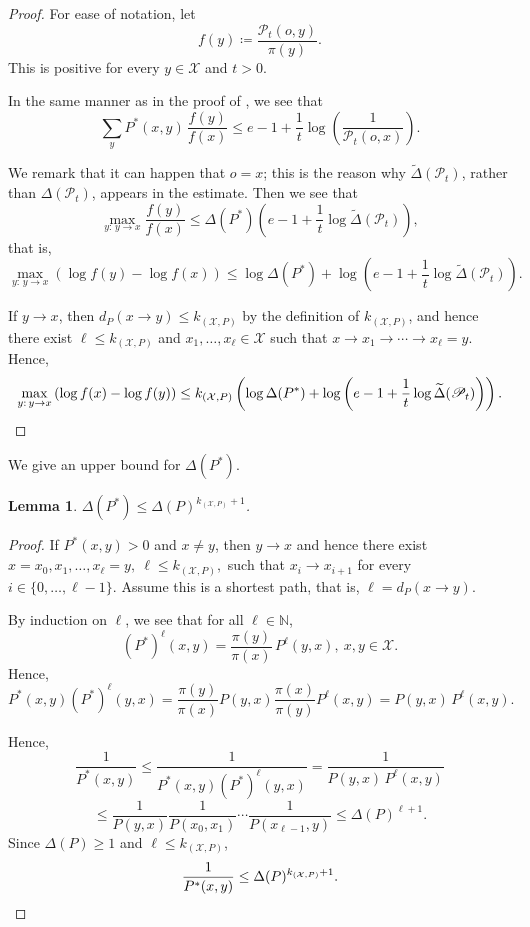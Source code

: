 \documentclass[a4paper, reqno, 11pt]{amsart}
\newtheorem{Lem}[Thm]{Lemma}
\theoremstyle{definition}
\begin{document}
\begin{proof} 
For ease of notation, let
\[ f(y) \coloneqq \frac{\mathscr{P}_{t} (o,y)}{\pi(y)}. \]
This is positive for every $y \in \mathcal{X}$ and $t > 0$. 


In the same manner as in the proof of \cite[Lemma 10]{Salez2024}, 
we see that 
\[ \sum_{y} P^*(x,y)\,\frac{f(y)}{f(x)} \le e-1+\frac{1}{t}\log\left(\frac{1}{\mathscr{P}_{t} (o,x)}\right). \]

We remark that it can happen that $o=x$; this is the reason why $\widetilde{\Delta}(\mathscr{P}_t)$, rather than $\Delta(\mathscr{P}_t)$, appears in the estimate.
Then we see that
\[ \max_{y:\,y\to x}\frac{f(y)}{f(x)} \le \Delta(P^*)\left(e-1+\frac{1}{t}\log \widetilde{\Delta}(\mathscr{P}_t)\right), \]
that is, 
\[ \max_{y:\,y\to x}\left(\log f(y)-\log f(x)\right) \le \log\Delta(P^*)+\log\left(e-1+\frac{1}{t}\log \widetilde{\Delta}(\mathscr{P}_t)\right).\]

If $y \to x$, then $d_P (x \to y) \le k_{(\mathcal{X}, P)}$ by the definition of $k_{(\mathcal{X}, P)}$,
and hence there exist $\ell \le k_{(\mathcal{X}, P)}$ and $x_1,\dots, x_\ell \in \mathcal{X}$
such that $x \to x_1\to \cdots \to x_\ell = y$.
Hence,
\[ \max_{y:\,y\to x}\left(\log f(x)-\log f(y)\right) \le k_{(\mathcal{X}, P)}\left(\log\Delta(P^*)+\log\left(e-1+\frac{1}{t}\log \widetilde{\Delta}(\mathscr{P}_t)\right) \right). \qedhere \]
\end{proof} 

We give an upper bound for $\Delta(P^*)$. 

\begin{Lem}\label{lem:delta-star}
$\Delta(P^*) \le \Delta(P)^{k_{(\mathcal{X}, P)}+1}$.
\end{Lem}

\begin{proof} 
If $P^*(x,y) > 0$ and $x \ne y$, then $y\to x$ and hence there exist
\(x = x_0,x_1,\dots,x_\ell = y, \ \ell \le k_{(\mathcal{X}, P)}, \)
such that \(x_i \to x_{i+1}\) for every  \(i \in \{0,\dots,\ell-1\} \). 
Assume this is a shortest path, that is, $\ell = d_P (x \to y)$.

By induction on $\ell$, 
we see that for all $\ell \in \mathbb{N}$,
\[ (P^*)^\ell(x,y)=\frac{\pi(y)}{\pi(x)}\,P^\ell(y,x), \ x, y \in \mathcal{X}. \]
Hence, 
\[ P^*(x,y)(P^*)^\ell(y,x) = \frac{\pi(y)}{\pi(x)}P(y,x)\frac{\pi(x)}{\pi(y)}P^\ell(x,y) = P(y,x)\,P^\ell(x,y). \]

Hence, 
\[ \frac{1}{P^*(x,y)} \le \frac{1}{P^*(x,y)(P^*)^\ell(y,x)} = \frac{1}{P(y,x)\,P^\ell(x,y)} \]
\[ \le \frac{1}{P(y,x)}\frac{1}{P(x_0,x_1)} \cdots \frac{1}{P(x_{\ell-1},y)} \le \Delta(P)^{\ell+1}.\]
Since $\Delta(P)\ge 1$ and $\ell\le k_{(\mathcal{X}, P)}$,
\[ \frac{1}{P^*(x,y)} \le \Delta(P)^{k_{(\mathcal{X}, P)}+1}. \qedhere \]
\end{proof}
\end{document}

